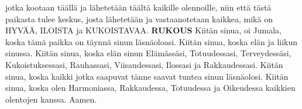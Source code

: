 {\begin{songs}{}
        jotka kootaan täällä ja lähetetään täältä kaikille
        olennoille, niin että tästä paikasta tulee keskus,
        josta lähetetään ja vastaanotetaan kaikkea, mikä on
        HYVÄÄ, ILOISTA ja KUKOISTAVAA.
        \parspace
        \textbf{RUKOUS}
        \parspace
        Kiitän sinua, oi Jumala, koska tämä paikka on täynnä
        sinun läsnäoloasi.
        \parspace
        Kiitän sinua, koska elän ja liikun sinussa.
        \parspace
        Kiitän sinua, koska elän sinun Elämässäsi, Totuudessasi,
        Terveydessäsi, Kukoistuksessasi, Rauhassasi,
        Viisaudessasi, Ilossasi ja Rakkaudessasi.
        \parspace
        Kiitän sinua, koska kaikki jotka saapuvat tänne saavat
        tuntea sinun läsnäolosi.
        \parspace
        Kiitän sinua, koska olen Harmoniassa, Rakkaudessa,
        Totuudessa ja Oikeudessa kaikkien olentojen kanssa.
        \parspace
        Aamen.
      \endverse
    \endsong


    \begin{intersong}
    \end{intersong}


  \end{songs}



  \scleardpage
  \setcounter{songnum}{1}

  \begin{songs}{}



\end{songs}}
